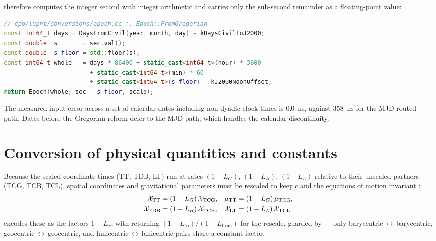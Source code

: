  therefore computes the integer second with integer
arithmetic \citep{hinnant2013} and carries only the sub-second remainder as a
floating-point value:

\begin{lstlisting}[language=cpp,caption={Integer-exact calendar conversion.},label={lst:tc-fromgregorian}]
// cpp/lupnt/conversions/epoch.cc :: Epoch::FromGregorian
const int64_t days = DaysFromCivil(year, month, day) - kDaysCivilToJ2000;
const double  s       = sec.val();
const double  s_floor = std::floor(s);
const int64_t whole   = days * 86400 + static_cast<int64_t>(hour) * 3600
                        + static_cast<int64_t>(min) * 60
                        + static_cast<int64_t>(s_floor) - kJ2000NoonOffset;
return Epoch(whole, sec - s_floor, scale);
\end{lstlisting}

The measured input error across a set of calendar dates including non-dyadic
clock times is \SI{0.0}{\nano\second}, against \SI{358}{\nano\second} for the
MJD-routed path. Dates before the Gregorian reform
defer to the MJD path, which handles the calendar discontinuity.

\section{Conversion of physical quantities and constants}
\label{sec:tc-scaling}

Because the scaled coordinate times (TT, TDB, LT) run at rates $(1-L_G)$,
$(1-L_B)$, $(1-L_L)$ relative to their unscaled partners (TCG, TCB, TCL),
spatial coordinates and gravitational parameters must be rescaled to keep $c$
and the equations of motion invariant
\citep[Eqs.~2.52--2.57]{iiyama2026thesis}:
%
\begin{align}
  \label{eq:tc-scale-tt}
  \mathcal{X}_{\mathrm{TT}}  &= (1-L_G)\,\mathcal{X}_{\mathrm{TCG}}, &
  \mu_{\mathrm{TT}}          &= (1-L_G)\,\mu_{\mathrm{TCG}}, \\
  \label{eq:tc-scale-tdb}
  \mathcal{X}_{\mathrm{TDB}} &= (1-L_B)\,\mathcal{X}_{\mathrm{TCB}}, &
  \mathcal{X}_{\mathrm{LT}}  &= (1-L_L)\,\mathcal{X}_{\mathrm{TCL}}.
\end{align}
%
\lupnt{} encodes these as the  factors $1 - L_x$, with
 returning
$(1-L_{\mathrm{to}})/(1-L_{\mathrm{from}})$ for the rescale, guarded by
 --- only
barycentric\,$\leftrightarrow$\,barycentric,
geocentric\,$\leftrightarrow$\,geocentric, and
lunicentric\,$\leftrightarrow$\,lunicentric pairs share a constant factor.


